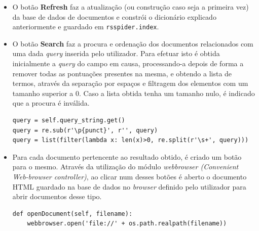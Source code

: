 \documentclass{article}
\begin{document}
\begin{itemize}
    \item O botão \textbf{Refresh} faz a atualização (ou construção caso seja a primeira vez) da base de dados de documentos e constrói o dicionário explicado anteriormente e guardado em \texttt{rsspider.index}.
    \item O botão \textbf{Search} faz a procura e ordenação dos documentos relacionados com uma dada \emph{query} inserida pelo utilizador. Para efetuar isto é obtida inicialmente a \emph{query} do campo em causa, processando-a depois de forma a remover todas as pontuações presentes na mesma, e obtendo a lista de termos, através da separação por espaços e filtragem dos elementos com um tamanho superior a 0. Caso a lista obtida tenha um tamanho nulo, é indicado que a procura é inválida.
    \begin{verbatim}
query = self.query_string.get()
query = re.sub(r'\p{punct}', r'', query)
query = list(filter(lambda x: len(x)>0, re.split(r'\s+', query)))
\end{verbatim}
    \item Para cada documento pertencente ao resultado obtido, é criado um botão para o mesmo. Através da utilização do módulo \emph{webbrowser (Convenient Web-browser controller)}, ao clicar num desses botões é aberto o documento HTML guardado na base de dados no \emph{browser} definido pelo utilizador para abrir documentos desse tipo.
    \begin{verbatim}
def openDocument(self, filename):
    webbrowser.open('file://' + os.path.realpath(filename))
\end{verbatim}
    
\end{itemize}
\end{document}
